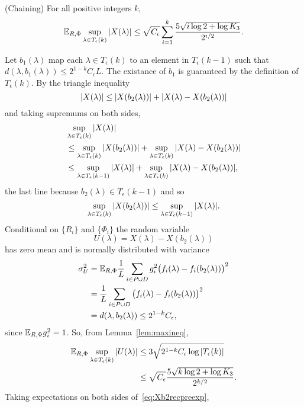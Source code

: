 \documentclass[journal]{IEEEtran}
\begin{document}
\begin{lemma}\label{lem:chaining3}(Chaining)
For all positive integers $k$,
\[
{\mathbb E}_{R,\Phi} \sup_{\lambda \in T_\epsilon(k) } {\left\vert  X(\lambda)  \right\vert} \leq \sqrt{C_\epsilon} \sum_{i=1}^k \frac{5\sqrt{i \log 2 + \log K_3}}{2^{i/2}}.
\]
\end{lemma}
\begin{IEEEproof}
Let $b_1(\lambda)$ map each $\lambda \in T_\epsilon(k)$ to an element in $T_\epsilon(k-1)$ such that $d(\lambda, b_1(\lambda)) \leq 2^{1-k}C_\epsilon L$.  The existance of $b_1$ is guaranteed by the definition of $T_\epsilon(k)$.  By the triangle inequality
\[
{\vert X(\lambda) \vert} \leq {\vert X(b_2(\lambda)) \vert} + {\vert X(\lambda) - X(b_2(\lambda)) \vert}  
\]
and taking supremums on both sides,
\begin{align}
&\sup_{\lambda \in T_\epsilon(k)}{\vert X(\lambda) \vert} \nonumber \\
&\leq \sup_{\lambda \in T_\epsilon(k)}{\vert X(b_2(\lambda)) \vert} + \sup_{\lambda \in T_\epsilon(k)} {\vert X(\lambda) - X(b_2(\lambda)) \vert}   \nonumber \\
&\leq \sup_{\lambda \in T_\epsilon(k-1)}{\vert X(\lambda) \vert} + \sup_{\lambda \in T_\epsilon(k)} {\vert X(\lambda) - X(b_2(\lambda)) \vert}, \label{eq:Xb2recpreexp}
\end{align}
the last line because $b_2(\lambda) \in T_\epsilon(k-1)$ and so
\[
\sup_{\lambda \in T_\epsilon(k)}{\vert X(b_2(\lambda)) \vert} \leq \sup_{\lambda \in T_\epsilon(k-1)}{\vert X(\lambda) \vert}.
\]
Conditional on $\{R_i\}$ and $\{\Phi_i\}$ the random variable
\[
U(\lambda) = X(\lambda) - X(b_2(\lambda))
\]
has zero mean and is normally distributed with variance
\begin{align*}
\sigma_U^2 &= {\mathbb E}_{R,\Phi} \frac{1}{L} \sum_{i \in P \cup D} g_i^2 \big( f_i(\lambda) - f_i(b_2(\lambda)) \big)^2 \\
&=  \frac{1}{L} \sum_{i \in P \cup D} \big( f_i(\lambda) - f_i(b_2(\lambda)) \big)^2 \\
&= d(\lambda, b_2(\lambda)) \leq 2^{1-k} C_\epsilon,
\end{align*}
since ${\mathbb E}_{R,\Phi}g_i^2 = 1$.  So, from Lemma~\ref{lem:maxineq},
\begin{align*}
{\mathbb E}_{R,\Phi} \sup_{\lambda \in T_\epsilon(k)} {\vert U(\lambda) \vert} &\leq 3 \sqrt{ 2^{1-k} C_\epsilon \log {\left\vert T_\epsilon(k) \right\vert} } \\
&\leq \sqrt{C_\epsilon} \frac{5\sqrt{k \log 2 + \log K_3}}{2^{k/2}}.
\end{align*}
Taking expectations on both sides of~\eqref{eq:Xb2recpreexp},

\end{IEEEproof}
\end{document}
